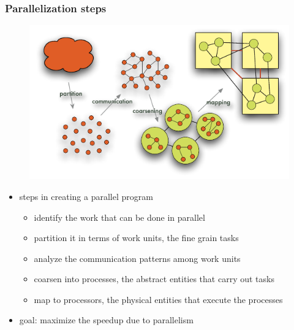 \begin{frame}[fragile]
%
  \frametitle{Parallelization steps}
%
  \begin{figure}
    \centering
    \includegraphics[scale=0.75]{figures/parallelization-steps.pdf}
    \label{fig:parallelization-steps}
  \end{figure}
  \vspace{-3.0em}
%
  \begin{itemize}
%
    \item steps in creating a parallel program
      \begin{itemize}
      \item identify the work that can be done in parallel
      \item partition it in terms of work units, the fine grain tasks
      \item analyze the communication patterns among work units
      \item coarsen into processes, the abstract entities that carry out tasks
      \item map to processors, the physical entities that execute the processes
      \end{itemize}
%
    \item goal: maximize the speedup due to parallelism
%
  \end{itemize}
%
\end{frame}

